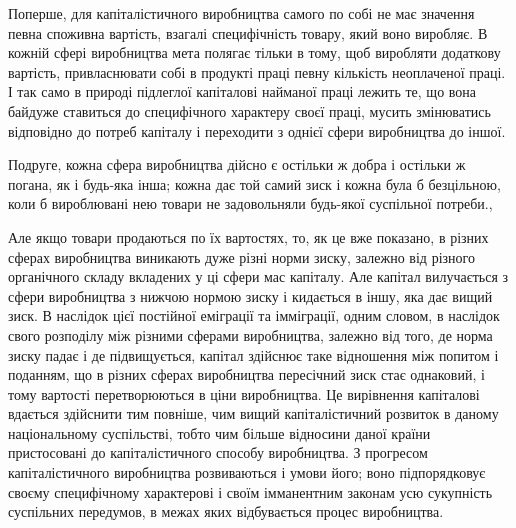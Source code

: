 Поперше, для капіталістичного виробництва самого по собі
не має значення певна споживна вартість, взагалі специфічність
товару, який воно виробляє. В кожній сфері виробництва
мета полягає тільки в тому, щоб виробляти додаткову
вартість, привласнювати собі в продукті праці певну кількість
неоплаченої праці. І так само в природі підлеглої капіталові
найманої праці лежить те, що вона байдуже ставиться до
специфічного характеру своєї праці, мусить змінюватись відповідно
до потреб капіталу і переходити з однієї сфери виробництва
до іншої.

Подруге, кожна сфера виробництва дійсно є остільки ж добра
і остільки ж погана, як і будь-яка інша; кожна дає той самий
зиск і кожна була б безцільною, коли б вироблювані нею товари
не задовольняли будь-якої суспільної потреби.,

Але якщо товари продаються по їх вартостях, то, як це вже
показано, в різних сферах виробництва виникають дуже різні
норми зиску, залежно від різного органічного складу вкладених
у ці сфери мас капіталу. Але капітал вилучається з сфери виробництва
з нижчою нормою зиску і кидається в іншу, яка дає
вищий зиск. В наслідок цієї постійної еміграції та імміграції,
одним словом, в наслідок свого розподілу між різними сферами
виробництва, залежно від того, де норма зиску падає і де підвищується,
капітал здійснює таке відношення між попитом і поданням,
що в різних сферах виробництва пересічний зиск
стає однаковий, і тому вартості перетворюються в ціни виробництва.
Це вирівнення капіталові вдається здійснити тим повніше,
чим вищий капіталістичний розвиток в даному національному
суспільстві, тобто чим більше відносини даної країни пристосовані
до капіталістичного способу виробництва. З прогресом капіталістичного
виробництва розвиваються і умови його; воно підпорядковує
своєму специфічному характерові і своїм імманентним
законам усю сукупність суспільних передумов, в межах яких
відбувається процес виробництва.

